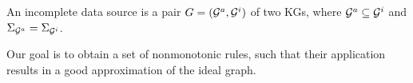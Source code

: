 \begin{definition} An incomplete data source is a pair
    $G = (\mathcal{G}^a, \mathcal{G}^i)$ of two KGs, where $\mathcal{G}^a\subseteq \mathcal{G}^i$ and
    $\Sigma_{\mathcal{G}^a}=\Sigma_{\mathcal{G}^i}$. 
\end{definition}

Our goal is to obtain a set of nonmonotonic rules, such that their application results in a good approximation of the ideal graph.
%
%


